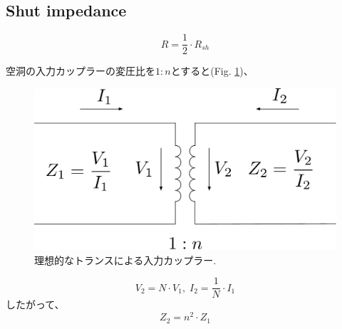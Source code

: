\documentclass[book]{jlreq}
\begin{document}
\subsection{Shut impedance}
\begin{equation}
    R = \frac{1}{2}\cdot R_{sh}
\end{equation}

空洞の入力カップラーの変圧比を$1:n$とすると(Fig. \ref{fig:Ideal_Trans})、
%
\begin{figure}[hbt]
    \begin{center}
        \includegraphics[width=12cm,clip]{figs/Ideal_Transformer.pdf}
        \caption{理想的なトランスによる入力カップラー.}
        \label{fig:Ideal_Trans}
    \end{center}
\end{figure}
%
\begin{equation}
    V_2 = N\cdot V_1, \; I_2 = \frac{1}{N}\cdot I_1
\end{equation}
%
したがって、
\begin{equation}
    Z_2 = n^2 \cdot Z_1 
\end{equation}
\end{document}
